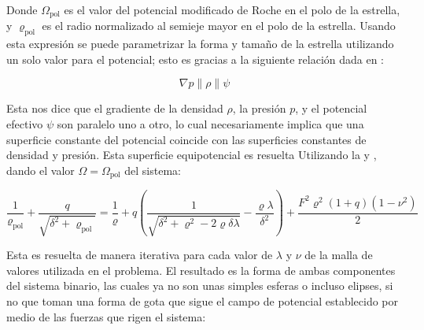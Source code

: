 Donde $\Omega_{\textrm{pol}}$ es el valor del potencial modificado de Roche en
el polo de la estrella, y $\varrho_{\textrm{pol}}$ es el radio normalizado al
semieje mayor en el polo de la estrella. Usando esta expresión se puede
parametrizar la forma y tamaño de la estrella utilizando un solo valor para el
potencial; esto es gracias a la siguiente relación dada en
:

\begin{eqfloat}[!ht]
	\centering
	\begin{equation}
		\nabla p \parallel \rho \parallel \psi
	\end{equation}
\end{eqfloat}

\newpage

Esta nos dice que el gradiente de la densidad $\rho$, la presión $p$, y el
potencial efectivo $\psi$ son paralelo uno a otro, lo cual necesariamente
implica que una superficie constante del potencial coincide con las superficies
constantes de densidad y presión. Esta superficie equipotencial es resuelta
Utilizando la  y
, dando el valor $\Omega =
\Omega_{\textrm{pol}}$ del sistema:

\begin{eqfloat}[!ht]
	\centering
	\begin{equation}
		\frac{1}{\varrho_{\textrm{pol}}} + \frac{q}{\sqrt{\delta^2 + \varrho_{\textrm{pol}}}} = \frac{1}{\varrho} + q \left(\frac{1}{\sqrt{\delta^2 + \varrho^2 - 2\varrho \delta \lambda}} - \frac{\varrho \lambda}{\delta^2} \right) + \frac{F^2 \varrho^2 (1 + q)(1 - \nu^2)}{2}
	\end{equation}
	\blankcaption
	\label{ecuacionRadioPolarEstelarEquivalencia}
\end{eqfloat}

Esta es resuelta de manera iterativa para cada valor de $\lambda$ y $\nu$ de la
malla de valores utilizada en el problema. El resultado es la forma de ambas
componentes del sistema binario, las cuales ya no son unas simples esferas o
incluso elipses, si no que toman una forma de gota que sigue el campo de
potencial establecido por medio de las fuerzas que rigen el sistema:

